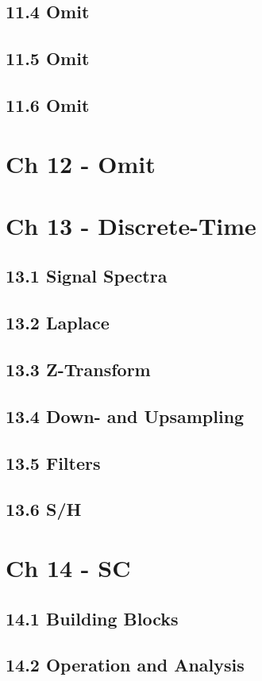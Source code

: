 \documentclass[a4paper,twocolumn]{article}
\begin{document}
    \subsection{11.4 Omit}
    \subsection{11.5 Omit}
    \subsection{11.6 Omit}
  \section{Ch 12 - Omit}
  \section{Ch 13 - Discrete-Time}
    \subsection{13.1 Signal Spectra}
    \subsection{13.2 Laplace}
    \subsection{13.3 Z-Transform}
    \subsection{13.4 Down- and Upsampling}
    \subsection{13.5 Filters}
    \subsection{13.6 S/H}
  \section{Ch 14 - SC}
    \subsection{14.1 Building Blocks}
    \subsection{14.2 Operation and Analysis}
\end{document}
